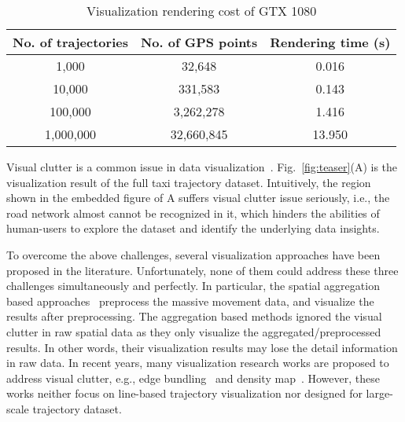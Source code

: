 \begin{table}
	\centering
    \small
	\caption{Visualization rendering cost of GTX 1080}
	\begin{tabular}{|c|c|c|} \hline
		No. of trajectories & No. of GPS points & Rendering time (s) \\ \hline
		1,000& 32,648 & 0.016\\ \hline
		10,000& 331,583 & 0.143\\ \hline
		100,000& 3,262,278 & 1.416\\ \hline
		1,000,000& 32,660,845 & 13.950\\ \hline
	\end{tabular}	\label{tab:gpu}
\end{table}

Visual clutter is a common issue in data visualization~\cite{clutter}.
Fig.~\ref{fig:teaser}(A) is the visualization result of the full \pt{} taxi trajectory dataset.
Intuitively, the region shown in the embedded figure of A suffers visual clutter issue seriously,
i.e., the road network almost cannot be recognized in it,
which hinders the abilities of human-users to explore the dataset and identify the underlying data insights.



To overcome the above challenges, several visualization approaches have been proposed in the literature.
Unfortunately, none of them could address these three challenges simultaneously and perfectly.
In particular, the spatial aggregation based approaches~\cite{zeng2013visualizing,von2015mobilitygraphs} preprocess the massive movement data, and visualize the results after preprocessing.
The aggregation based methods ignored the visual clutter in raw spatial data as they only visualize the aggregated/preprocessed results.
In other words, their visualization results may lose the detail information in raw data.
In recent years, many visualization research works are proposed to address visual clutter,
e.g., edge bundling~\cite{zeng2019route, thony2015vector} and density map~\cite{lampe2011interactive, scheepens2011interactive}.
However, these works neither focus on line-based trajectory visualization nor designed for large-scale trajectory dataset.

